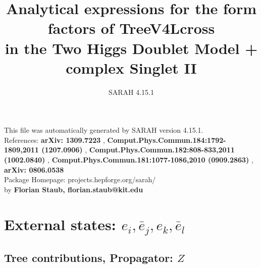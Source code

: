 \documentclass[A4,landscape]{article}
\begin{document}
\title{Analytical expressions for the form factors of TreeV4Lcross\\ in the Two Higgs Doublet Model + complex Singlet II } 
 \author{SARAH 4.15.1} 
 \maketitle 
 \vspace{10cm} 
This file was automatically generated by SARAH version 4.15.1.  \\ 
References: {\bf arXiv: 1309.7223 }, {\bf Comput.Phys.Commun.184:1792-1809,2011 (1207.0906) }, {\bf Comput.Phys.Commun.182:808-833,2011 (1002.0840) }, {\bf Comput.Phys.Commun.181:1077-1086,2010 (0909.2863) }, {\bf arXiv: 0806.0538 } \\ 
Package Homepage: projects.hepforge.org/sarah/ \\ 
by {\bf Florian Staub, florian.staub@kit.edu} 
 \pagebreak 
 \tableofcontents 
 \pagebreak 
\section{External states: ${e_{{i}}, \bar{e}_{{j}}, e_{{k}}, \bar{e}_{{l}}}$} 
\subsection{Tree contributions, Propagator: $Z$} 
\end{document}
